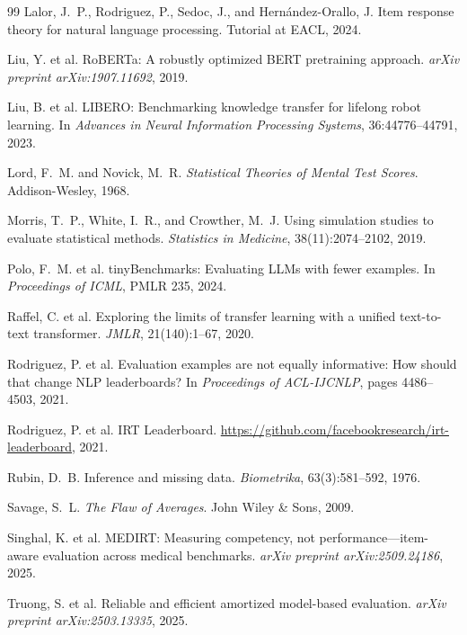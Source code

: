 \documentclass[11pt,a4paper]{article}
\begin{document}
\begin{thebibliography}{99}
 Lalor, J.~P., Rodriguez, P., Sedoc, J., and Hern\'{a}ndez-Orallo, J. Item response theory for natural language processing. Tutorial at EACL, 2024.

 Liu, Y. et al. RoBERTa: A robustly optimized BERT pretraining approach. \emph{arXiv preprint arXiv:1907.11692}, 2019.

 Liu, B. et al. LIBERO: Benchmarking knowledge transfer for lifelong robot learning. In \emph{Advances in Neural Information Processing Systems}, 36:44776--44791, 2023.

 Lord, F.~M. and Novick, M.~R. \emph{Statistical Theories of Mental Test Scores}. Addison-Wesley, 1968.

 Morris, T.~P., White, I.~R., and Crowther, M.~J. Using simulation studies to evaluate statistical methods. \emph{Statistics in Medicine}, 38(11):2074--2102, 2019.

 Polo, F.~M. et al. tinyBenchmarks: Evaluating LLMs with fewer examples. In \emph{Proceedings of ICML}, PMLR 235, 2024.

 Raffel, C. et al. Exploring the limits of transfer learning with a unified text-to-text transformer. \emph{JMLR}, 21(140):1--67, 2020.

 Rodriguez, P. et al. Evaluation examples are not equally informative: How should that change NLP leaderboards? In \emph{Proceedings of ACL-IJCNLP}, pages 4486--4503, 2021.

 Rodriguez, P. et al. IRT Leaderboard. \url{https://github.com/facebookresearch/irt-leaderboard}, 2021.

 Rubin, D.~B. Inference and missing data. \emph{Biometrika}, 63(3):581--592, 1976.

 Savage, S.~L. \emph{The Flaw of Averages}. John Wiley \& Sons, 2009.

 Singhal, K. et al. MEDIRT: Measuring competency, not performance---item-aware evaluation across medical benchmarks. \emph{arXiv preprint arXiv:2509.24186}, 2025.

 Truong, S. et al. Reliable and efficient amortized model-based evaluation. \emph{arXiv preprint arXiv:2503.13335}, 2025.


\end{thebibliography}
\end{document}
